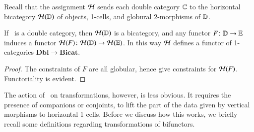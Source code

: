 \documentclass{amsart}
\begin{document}
Recall that the assignment $\mathcal{H}$ sends each double category $\mathbb{C}$ to the horizontal bicategory  $\mathcal{H}(\mathbb{D})$ of objects, 1-cells, and globural 2-morphisms of $\mathbb{D}$.

\begin{thm}\label{thm:1-func}
  If \lD\ is a double category, then $\mathcal{H}(\mathbb{D})$ is a bicategory, and
  any functor $F\colon \mathbb{D}\to\mathbb{E}$ induces a functor $\mathcal{H}(F)\colon
  \mathcal{H}(\mathbb{D})\to\mathcal{H}(\mathbb{E})$.  In this way $\mathcal{H}$ defines a functor of
  1-categories $\mathbf{Dbl}\to \mathbf{Bicat}$.
\end{thm}
\begin{proof}
  The constraints of $F$ are all globular, hence give constraints for
  $\mathcal{H}(F)$.  Functoriality is evident.
\end{proof}

The action of \cH\ on transformations, however, is less obvious. It
requires the presence of companions or conjoints, to lift the part of the data given by vertical morphisms to horizontal 1-cells. Before we discuss how this works, we briefly recall some definitions regarding transformations of bifunctors. 
\end{document}
